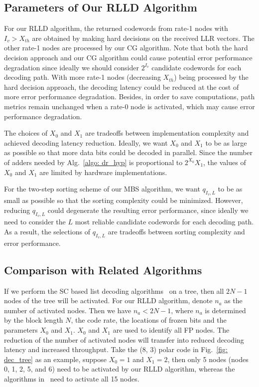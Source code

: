 \documentclass[journal]{IEEEtran}
\begin{document}
\subsection{Parameters of Our RLLD Algorithm} \label{sec: dicus_parameter}
For our RLLD algorithm, the returned codewords from rate-1 nodes with $I_v> X_{th}$ are obtained by making hard decisions on the received LLR vectors. The other rate-1 nodes are processed by our CG algorithm. Note that both the hard decision approach and our CG algorithm could cause potential error performance degradation since ideally we should consider $2^{I_v}$ candidate codewords for each decoding path. With more rate-1 nodes (decreasing $X_{th}$) being processed by the hard decision approach, the decoding latency could be reduced at the cost of more error performance degradation. Besides, in order to save computations, path metrics remain unchanged when a rate-0 node is activated, which may cause error performance degradation.

The choices of $X_0$ and $X_1$ are tradeoffs between implementation complexity and achieved decoding latency reduction. Ideally, we want $X_0$ and $X_1$ to be as large as possible so that more data bits could be decoded in parallel. Since the number of adders needed by Alg.~\ref{algo: dr_hyp} is proportional to $2^{X_0}X_1$, the values of $X_0$ and $X_1$ are limited by hardware implementations.

For the two-step sorting scheme of our MBS algorithm, we want $q_{I_v,L}$ to be as small as possible so that the sorting complexity could be minimized. However, reducing $q_{I_v,L}$ could degenerate the resulting error performance, since ideally we need to consider the $L$ most reliable candidate codewords for each decoding path. As a result, the selections of $q_{I_v,L}$ are tradeoffs between sorting complexity and error performance.


\subsection{Comparison with Related Algorithms} \label{sec: algo_cmp}
If we perform the SC based list decoding algorithms~\cite{ido_it, tree_list_dec} on a tree, then all $2N-1$ nodes of the tree will be activated. For our RLLD algorithm, denote $n_a$ as the number of activated nodes. Then we have $n_a < 2N-1$, where $n_a$ is determined by the block length $N$, the code rate, the locations of frozen bits and the parameters $X_0$ and $X_1$. $X_0$ and $X_1$ are used to identify all FP nodes. The reduction of the number of activated nodes will transfer into reduced decoding latency and increased throughput. Take the (8, 3) polar code in Fig.~\ref{fig: dec_tree} as an example, suppose $X_0=1$ and $X_1 = 2$, then only 5 nodes (nodes 0, 1, 2, 5, and 6) need to be activated by our RLLD algorithm, whereas the algorithms in~\cite{ido_it, tree_list_dec} need to activate all 15 nodes.
\end{document}
